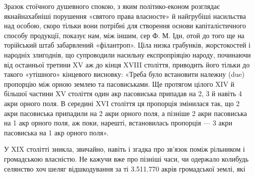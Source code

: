 Зразок стоїчного душевного спокою, з яким політико-економ
розглядає якнайнахабніші порушення «святого права власносте»
й найгрубіші насильства над особою, скоро тільки вони
потрібні для створення основи капіталістичного способу продукції,
показує нам, між іншим, сер Ф. М. Ідн, отой до того
ще на торійський штаб забарвлений «філантроп». Ціла низка грабунків,
жорстокостей і народніх злигоднів, що супроводили насильну
експропріяцію народу, починаючи від останньої третини
XV аж до кінця XVIII століття, приводить його тільки до
такого «утішного» кінцевого висновку: «Треба було встановити
належну (due) пропорцію між орною землею та пасовиськами.
Ще протягом цілого XIV й більшої частини XV століття
один акр пасовиська припадав на 2, 3 й навіть 4 акри орного
поля. В середині XVI століття ця пропорція змінилася так, що
2 акри пасовиська припадили на 2 акри орного поля, а пізніше
2 акри пасовиська на 1 акр орного поля, аж поки, нарешті, встановилась
пропорція — 3 акри пасовиська на 1 акр орного поля».

У XIX столітті зникла, звичайно, навіть і згадка про зв’язок
поміж рільником і громадською власністю. Не кажучи вже
про пізніші часи, чи одержало колибудь селянство хоч шеляг
відшкодування за ті \num{3.511.770} акрів громадської землі, які
\parbreak{}  %
